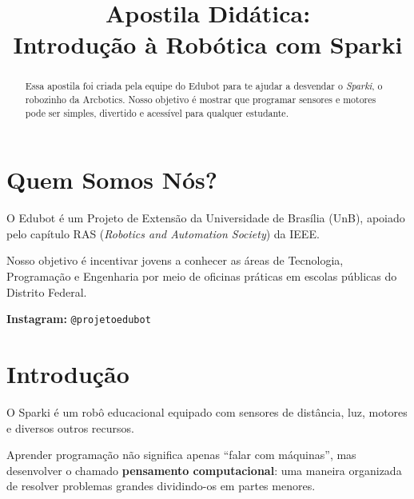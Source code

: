 \documentclass[conference]{IEEEtran}
\begin{document}
\title{
\Huge Apostila Didática:\\[0.2cm]
\LARGE Introdução à Robótica com Sparki
}

\author{
}

\maketitle

\begin{abstract}
Essa apostila foi criada pela equipe do Edubot para te ajudar a desvendar o \textit{Sparki}, o robozinho da Arcbotics. Nosso objetivo é mostrar que programar sensores e motores pode ser simples, divertido e acessível para qualquer estudante.
\end{abstract}

\vspace{0.5cm}

\section{Quem Somos Nós?}

O Edubot é um Projeto de Extensão da Universidade de Brasília (UnB), apoiado pelo capítulo RAS (\textit{Robotics and Automation Society}) da IEEE.

Nosso objetivo é incentivar jovens a conhecer as áreas de Tecnologia, Programação e Engenharia por meio de oficinas práticas em escolas públicas do Distrito Federal.

\vspace{0.2cm}

\noindent
\textbf{Instagram:} \texttt{@projetoedubot}

\section{Introdução}

O Sparki é um robô educacional equipado com sensores de distância, luz, motores e diversos outros recursos.

Aprender programação não significa apenas “falar com máquinas”, mas desenvolver o chamado \textbf{pensamento computacional}: uma maneira organizada de resolver problemas grandes dividindo-os em partes menores.
\end{document}
